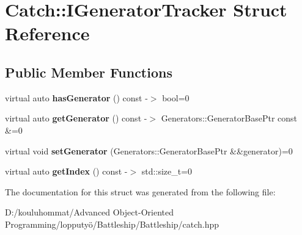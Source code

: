 \hypertarget{struct_catch_1_1_i_generator_tracker}{}\section{Catch\+:\+:I\+Generator\+Tracker Struct Reference}
\label{struct_catch_1_1_i_generator_tracker}
\subsection*{Public Member Functions}
\begin{DoxyCompactItemize}
\item 
\mbox{\label{struct_catch_1_1_i_generator_tracker_ae88084f9af27c8b9a5d5775b9c148498}} 
virtual auto {\bfseries has\+Generator} () const -\/$>$ bool=0
\item 
\mbox{\label{struct_catch_1_1_i_generator_tracker_a23be942fc51672598bfa02c678c3078a}} 
virtual auto {\bfseries get\+Generator} () const -\/$>$ Generators\+::\+Generator\+Base\+Ptr const \&=0
\item 
\mbox{\label{struct_catch_1_1_i_generator_tracker_a9945eff42219edc5a7071eebd8b0419e}} 
virtual void {\bfseries set\+Generator} (Generators\+::\+Generator\+Base\+Ptr \&\&generator)=0
\item 
\mbox{\label{struct_catch_1_1_i_generator_tracker_a2922f0d8bc7a732079eadbda78e30f79}} 
virtual auto {\bfseries get\+Index} () const -\/$>$ std\+::size\+\_\+t=0
\end{DoxyCompactItemize}


The documentation for this struct was generated from the following file\+:\begin{DoxyCompactItemize}
\item 
D\+:/kouluhommat/\+Advanced Object-\/\+Oriented Programming/lopputyö/\+Battleship/\+Battleship/catch.\+hpp\end{DoxyCompactItemize}

